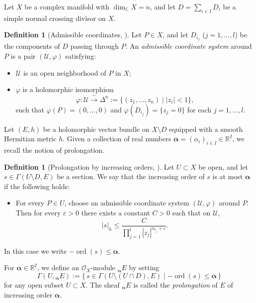 \documentclass[12pt,twoside]{amsart}
\DeclareMathOperator{\ord}{ord}
\theoremstyle{definition}
\newtheorem{defn}[thm]{Definition}
\begin{document}
\medskip

Let $X$ be a complex manifold with $\dim_{\mathbb{C}} X = n$, and let  
$D = \sum_{i \in I} D_i$ be a simple normal crossing divisor on $X$.

\begin{defn}[Admissible coordinates, {\cite[Definition~4.1]{mochizuki1}}]\label{x-def2.1}
Let $P \in X$, and let $D_{i_j}$ ($j=1,\dots,l$) be the components of $D$ passing through $P$.  
An \emph{admissible coordinate system} around $P$ is a pair $(\mathcal{U},\varphi)$ satisfying:
\begin{itemize}
  \item $\mathcal{U}$ is an open neighborhood of $P$ in $X$;
  \item $\varphi$ is a holomorphic isomorphism  
  \[
     \varphi : \mathcal{U} \xrightarrow{\ \sim\ } \Delta^n:=\{(z_1,\dots,z_n)\mid |z_i|<1\},
  \]
  such that $\varphi(P) = (0,\dots,0)$ and  
  $\varphi(D_{i_j})=\{z_j=0\}$ for each $j=1,\dots,l$.
\end{itemize}
\end{defn}

Let $(E,h)$ be a holomorphic vector bundle on $X\setminus D$ equipped with a smooth Hermitian metric $h$.  
Given a collection of real numbers $\bm{\alpha} = (\alpha_i)_{i\in I}\in \mathbb{R}^I$, we recall the notion of prolongation.

\begin{defn}[Prolongation 
by increasing orders, 
{\cite[Definition~4.2]{mochizuki2}}]\label{x-def2.2}
Let $U \subset X$ be open, and let $s \in \Gamma(U\setminus D, E)$ be a section.  
We say that the increasing order of $s$ is at most $\bm{\alpha}$ if the following holds:
\begin{itemize}
  \item For every $P\in U$, choose an admissible coordinate system $(\mathcal{U},\varphi)$ around $P$.  
  Then for every $\varepsilon>0$ there exists a constant $C>0$ such that on $\mathcal{U}$,
  \[
    |s|_h \le \frac{C}{\prod_{j=1}^l |z_j|^{\alpha_{i_j}+\varepsilon}}.
  \]
\end{itemize}
In this case we write $-\ord(s)\le \bm{\alpha}$.
\end{defn}

For $\bm{\alpha}\in\mathbb{R}^I$, we define an $\mathcal{O}_X$-module ${}_{\bm{\alpha}}E$ by setting
\[
  \Gamma(U, {}_{\bm{\alpha}}E) := 
  \{\, s \in \Gamma(U\setminus (U\cap D), E)\mid -\ord(s)\le \bm{\alpha}\,\}
\] 
for any open subset $U\subset X$. 
The sheaf ${}_{\bm{\alpha}}E$ is called the \emph{prolongation} of $E$ of increasing order $\bm{\alpha}$.
\end{document}
